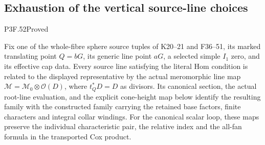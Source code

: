 \subsection{Exhaustion of the vertical source-line choices}
\begin{statement}{P3F.52}{Proved}

Fix one of the whole-fibre sphere source tuples of K20--21 and
F36--51, its marked translating point \(Q=bG\), its generic line
point \(aG\), a selected simple \(I_1\) zero, and its effective
cap data. Every source line satisfying the literal Hom condition
is related to the displayed representative by the actual
meromorphic line map \(\mathcal M=\mathcal M_0\otimes\mathcal O(D)\),
where \(t_Q^*D=D\) as divisors.
Its canonical section, the actual root-line evaluation, and the
explicit cone-height map below identify the resulting family
with the constructed family carrying the retained base factors,
finite characters and integral collar windings.
For the canonical scalar loop, these maps preserve the individual
characteristic pair, the relative index and the all-fan formula
in the transported Cox product.
\end{statement}
